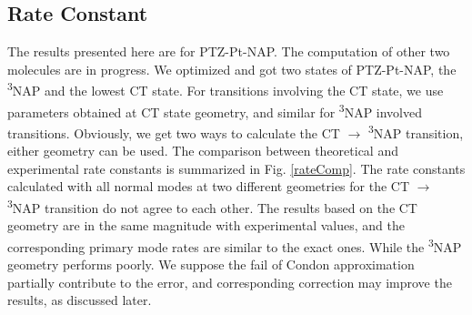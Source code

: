\subsection{Rate Constant}
The results presented here are for PTZ-Pt-NAP. The computation of other two molecules are in progress. We optimized and got two states of PTZ-Pt-NAP, the \textsuperscript{3}NAP and the lowest CT state. For transitions involving the CT state, we use parameters obtained at CT state geometry, and similar for \textsuperscript{3}NAP involved transitions. Obviously, we get two ways to calculate the CT $\rightarrow$ \textsuperscript{3}NAP transition, either geometry can be used. The comparison between theoretical and experimental rate constants is summarized in Fig. \ref{rateComp}. The rate constants calculated with all normal modes at two different geometries for the CT $\rightarrow$ \textsuperscript{3}NAP transition do not agree to each other. The results based on the CT geometry are in the same magnitude with experimental values, and the corresponding primary mode rates are similar to the exact ones. While the \textsuperscript{3}NAP geometry performs poorly. We suppose the fail of Condon approximation partially contribute to the error, and corresponding correction may improve the results, as discussed later.

